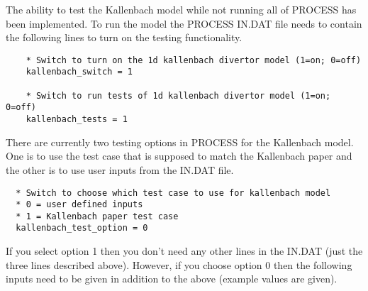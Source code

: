 \documentclass[11pt,a4paper]{report}
\begin{document}
The ability to test the Kallenbach model while not running all of PROCESS has 
been implemented. To run the model the PROCESS IN.DAT file needs to contain the 
following lines to turn on the testing functionality.

\begin{mdframed}
  \begin{verbatim}
    * Switch to turn on the 1d kallenbach divertor model (1=on; 0=off)
    kallenbach_switch = 1

    * Switch to run tests of 1d kallenbach divertor model (1=on; 0=off)
    kallenbach_tests = 1
  \end{verbatim}
\end{mdframed}

 There are currently two testing options in PROCESS for the Kallenbach model. 
 One is to use the test case that is supposed to match the Kallenbach paper and 
 the other is to use user inputs from the IN.DAT file.

\begin{mdframed}
\begin{verbatim}
  * Switch to choose which test case to use for kallenbach model
  * 0 = user defined inputs
  * 1 = Kallenbach paper test case
  kallenbach_test_option = 0
\end{verbatim}
\end{mdframed}

 If you select option 1 then you don't need any other lines in the IN.DAT (just 
 the three lines described above). However, if you choose option 0 then the 
 following inputs need to be given in addition to the above (example values 
 are given).
\end{document}
